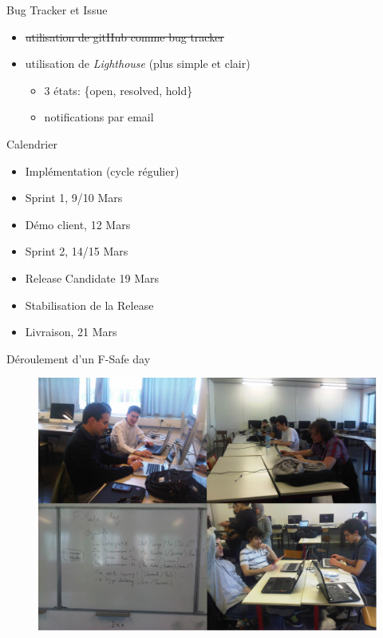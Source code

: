 \begin{frame}{Bug Tracker et Issue}
  \begin{block}{}
    \begin{itemize}
      \item \sout{utilisation de gitHub comme bug tracker}
      \item utilisation de \emph{Lighthouse} (plus simple et clair)
        \begin{itemize}
          \item 3 états: \{open, resolved, hold\}
          \item notifications par email
        \end{itemize}
    \end{itemize}
  \end{block}
\end{frame}

\begin{frame}{Calendrier}
  \begin{itemize}
    \item Implémentation (cycle régulier) 
    \item Sprint 1, 9/10 Mars
    \item Démo client, 12 Mars
    \item Sprint 2, 14/15 Mars
    \item Release Candidate 19 Mars
    \item Stabilisation de la Release
    \item Livraison, 21 Mars
  \end{itemize}
\end{frame}

\begin{frame}{Déroulement d'un F-Safe day}
  \begin{figure}
    \includegraphics[scale=0.27]{img/FSafeDay.png}
  \end{figure} 
\end{frame}

